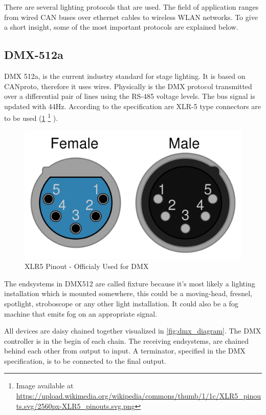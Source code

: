 There are several lighting protocols that are used. The field of application ranges from wired CAN buses over ethernet cables to wireless WLAN networks.
To give a short insight, some of the most important protocols are explained below.

\subsection*{DMX-512a}
\ac{DMX} 512a, is the current industry standard for stage lighting. It is based on \ac{CANproto}, therefore it uses wires.
Physically is the DMX protocol transmitted over a differential pair of lines using the RS-485 voltage levels. 
The bus signal is updated with 44Hz.
According to the specification are XLR-5 type connectors are to be used (\cref{fig:xlr}
\footnote{Image available at \url{https://upload.wikimedia.org/wikipedia/commons/thumb/1/1c/XLR5_pinouts.svg/2560px-XLR5_pinouts.svg.png}}
).

\begin{figure}[h]
	\centering
	\includegraphics[trim={0 0 0 0.0cm}, clip, scale=0.05]{figures/XLR_stecker.png}
	\caption{XLR5 Pinout - Officialy Used for DMX}
	\label{fig:xlr}
\end{figure}

The endsystems in DMX512 are called fixture because it's most likely a lighting installation which is mounted somewhere, 
this could be a moving-head, fresnel, spotlight, stroboscope or any other light installation.
It could also be a fog machine that emits fog on an appropriate signal.

All devices are daisy chained together visualized in \ref{fig:dmx_diagram}.
The DMX controller is in the begin of each chain.
The receiving endsystems, are chained behind each other from output to input. 
A terminator, specified in the DMX specification, is to be connected to the final output.
 

